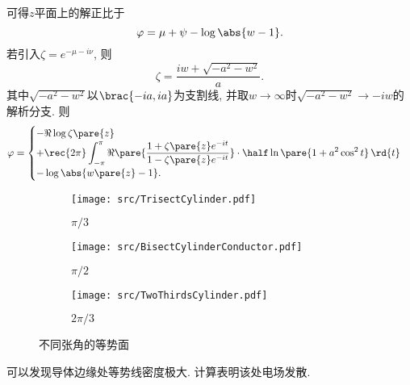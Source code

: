 \documentclass[hidelinks]{ctexart}
\begin{document}
可得$z$平面上的解正比于
\[ \varphi = \mu + \psi - \log \abs{w - 1}. \]
若引入$\zeta = e^{-\mu - i\nu}$, 则
\[ \zeta = \frac{iw + \sqrt{-a^2 - w^2}}{a}. \]
其中$\sqrt{-a^2 - w^2}$以$\brac{-ia,ia}$为支割线, 并取$w\rightarrow\infty$时$\sqrt{-a^2 - w^2} \rightarrow -iw$的解析分支. 则
\[ \varphi = \begin{cases}
    -\Re \log \zeta\pare{z}\\ \displaystyle + \rec{2\pi} \int_{-\pi}^{\pi} \Re\pare{\frac{1+\zeta\pare{z}e^{-it}}{1-\zeta\pare{z}e^{-it}}}\cdot \half \ln \pare{1+a^2\cos^2 t}\,\rd{t}\\ - \log\abs{w\pare{z} - 1}.
\end{cases}  \]
\begin{figure}
    \centering
    \begin{subfigure}{.3\linewidth}
        \centering
        \texttt{[image: src/TrisectCylinder.pdf]}
        \caption{$\pi/3$}
    \end{subfigure}
    \begin{subfigure}{.3\linewidth}
        \centering
        \texttt{[image: src/BisectCylinderConductor.pdf]}
        \caption{$\pi/2$}
    \end{subfigure}
    \begin{subfigure}{.3\linewidth}
        \centering
        \texttt{[image: src/TwoThirdsCylinder.pdf]}
        \caption{$2\pi/3$}
    \end{subfigure}
    \caption*{不同张角的等势面}
\end{figure}
可以发现导体边缘处等势线密度极大. 计算表明该处电场发散.
\end{document}
